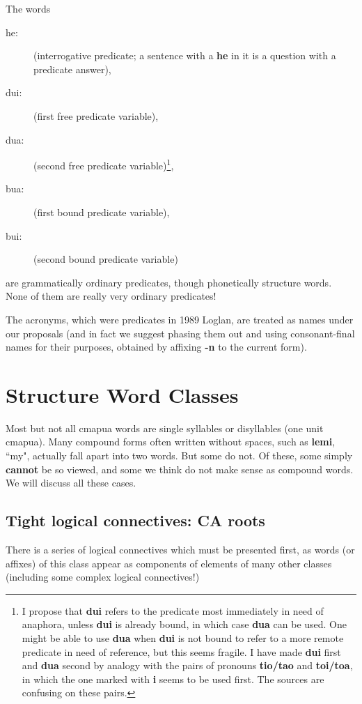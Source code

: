 \documentclass[12pt]{book}
\begin{document}
The words
\begin{description}
\item[he:] (interrogative predicate; a sentence with a {\bf he} in it is a question with a predicate answer), 
\item[dui:] (first free predicate variable), 
\item[dua:] (second free predicate variable)\footnote{I propose that {\bf dui} refers to the predicate most immediately in need of anaphora, unless {\bf dui} is already bound, in which case {\bf dua} can be used.  One might be able to use {\bf dua} when {\bf dui} is not bound to refer to a more remote predicate in need of reference, but this seems fragile.  I have made {\bf dui} first and {\bf dua} second by analogy with the pairs of pronouns {\bf tio/tao} and {\bf toi/toa}, in which the one marked with {\bf i} seems to be used first.  The sources are confusing on these pairs.},
\item[bua:] (first bound predicate variable), 
\item[bui:] (second bound predicate variable)
\end{description}

 are grammatically ordinary predicates, though phonetically structure words.   None of them are really very ordinary predicates!

The acronyms, which were predicates in 1989 Loglan, are treated as names under our proposals (and in fact we suggest phasing them out and using consonant-final names for their purposes, obtained by affixing {\bf -n} to the current form).

\section{Structure Word Classes}



Most but not all cmapua words are single syllables or disyllables (one unit cmapua).  Many compound forms often written without spaces, such as {\bf lemi},  ``my", actually fall apart into two words.  But some do not.  Of these, some simply {\bf cannot\/} be so viewed, and some we think  do not make sense as compound words.  We will discuss all these cases.

\subsection{Tight logical connectives:  CA roots}

There is a series of logical connectives which must be presented first, as words (or affixes) of this class appear as components of elements of many other classes
(including some complex logical connectives!)
\end{document}
